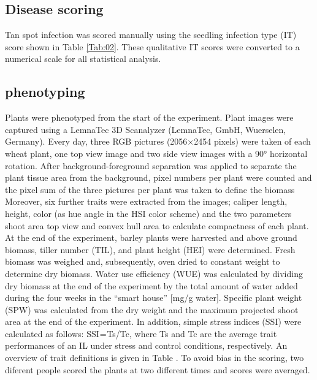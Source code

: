 \documentclass{frontiersSCNS} %
\begin{document}
\subsection{Disease scoring}
Tan spot infection was scored manually using the seedling infection type (IT) score shown in Table \ref{Tab:02}. These qualitative IT scores were converted to a numerical scale for all statistical analysis.

\subsection{phenotyping}
Plants were phenotyped from the start of the experiment. Plant images were captured using a LemnaTec 3D Scanalyzer (LemnaTec, GmbH, Wuerselen, Germany). Every day, three RGB pictures (2056×2454 pixels) were taken of each wheat plant, one top view image and two side view images with a 90° horizontal rotation. After background-foreground separation was applied to separate the plant tissue area from the background, pixel numbers per plant were counted and the pixel sum of the three pictures per plant was taken to define the biomass %
Moreover, six further traits were extracted from the images; caliper length, height, color (as hue angle in the HSI color scheme) and the two parameters shoot area top view and convex hull area to calculate compactness of each plant. At the end of the experiment, barley plants were harvested and above ground biomass, tiller number (TIL), and plant height (HEI) were determined. Fresh biomass was weighed and, subsequently, oven dried to constant weight to determine dry biomass. Water use efficiency (WUE) was calculated by dividing dry biomass at the end of the experiment by the total amount of water added during the four weeks in the “smart house” [mg/g water]. Specific plant weight (SPW) was calculated from the dry weight and the maximum projected shoot area at the end of the experiment. In addition, simple stress indices (SSI) were calculated as follows: SSI = Ts/Tc, where Ts and Tc are the average trait performances of an IL under stress and control conditions, respectively. An overview of trait definitions is given in Table . To avoid bias in the scoring, two diferent people scored the plants  at two different times and scores were averaged. 
\end{document}
